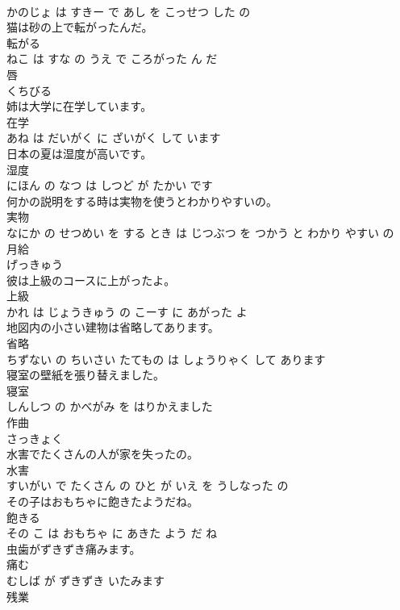 \documentclass[8pt]{extreport}
\begin{document}
\begin{CJK}{UTF8}{min}
\\	かのじょ は すきー で あし を こっせつ した の			
\\	猫は砂の上で転がったんだ。	
\\	転がる 
\\	ねこ は すな の うえ で ころがった ん だ			
\\	唇	
\\	くちびる			
\\	姉は大学に在学しています。	
\\	在学 
\\	あね は だいがく に ざいがく して います			
\\	日本の夏は湿度が高いです。	
\\	湿度 
\\	にほん の なつ は しつど が たかい です			
\\	何かの説明をする時は実物を使うとわかりやすいの。	
\\	実物 
\\	なにか の せつめい を する とき は じつぶつ を つかう と わかり やすい の			
\\	月給	
\\	げっきゅう			
\\	彼は上級のコースに上がったよ。	
\\	上級 
\\	かれ は じょうきゅう の こーす に あがった よ			
\\	地図内の小さい建物は省略してあります。	
\\	省略 
\\	ちずない の ちいさい たてもの は しょうりゃく して あります			
\\	寝室の壁紙を張り替えました。	
\\	寝室 
\\	しんしつ の かべがみ を はりかえました			
\\	作曲	
\\	さっきょく			
\\	水害でたくさんの人が家を失ったの。	
\\	水害 
\\	すいがい で たくさん の ひと が いえ を うしなった の			
\\	その子はおもちゃに飽きたようだね。	
\\	飽きる 
\\	その こ は おもちゃ に あきた よう だ ね			
\\	虫歯がずきずき痛みます。	
\\	痛む 
\\	むしば が ずきずき いたみます			
\\	残業	

\end{CJK}
\end{document}
